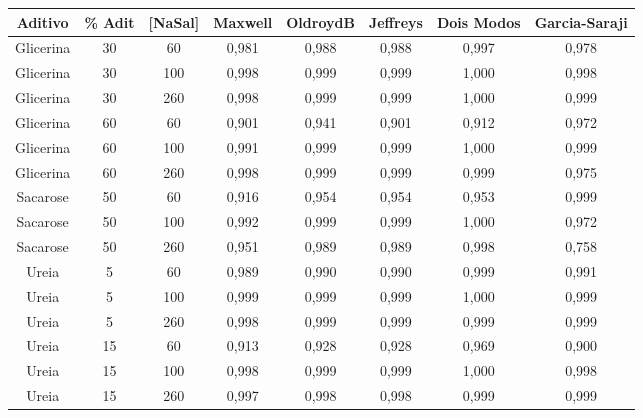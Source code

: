 	\begin{table}[h]
	{%
		\begin{tabular}{c c c | c c c c c}
			\toprule
            Aditivo  & \% Adit & [NaSal] & Maxwell & OldroydB & Jeffreys & Dois Modos  & Garcia-Saraji  \\ \midrule
			Glicerina & 30        & 60         & 0,981   & 0,988    & 0,988    & 0,997 & 0,978    \\
			Glicerina & 30        & 100        & 0,998   & 0,999    & 0,999    & 1,000 & 0,998    \\
			Glicerina & 30        & 260        & 0,998   & 0,999    & 0,999    & 1,000 & 0,999    \\
			Glicerina & 60        & 60         & 0,901   & 0,941    & 0,901    & 0,912 & 0,972    \\
			Glicerina & 60        & 100        & 0,991   & 0,999    & 0,999    & 1,000 & 0,999    \\
			Glicerina & 60        & 260        & 0,998   & 0,999    & 0,999    & 0,999 & 0,975    \\
			Sacarose  & 50        & 60         & 0,916   & 0,954    & 0,954    & 0,953 & 0,999    \\
			Sacarose  & 50        & 100        & 0,992   & 0,999    & 0,999    & 1,000 & 0,972    \\
			Sacarose  & 50        & 260        & 0,951   & 0,989    & 0,989    & 0,998 & 0,758    \\ \midrule
			Ureia   & 5         & 60         & 0,989   & 0,990    & 0,990    & 0,999   & 0,991  \\
			Ureia   & 5         & 100        & 0,999   & 0,999    & 0,999    & 1,000   & 0,999  \\
			Ureia   & 5         & 260        & 0,998   & 0,999    & 0,999    & 0,999   & 0,999  \\
			Ureia   & 15        & 60         & 0,913   & 0,928    & 0,928    & 0,969   & 0,900  \\
			Ureia   & 15        & 100        & 0,998   & 0,999    & 0,999    & 1,000   & 0,998  \\
			Ureia   & 15        & 260        & 0,997   & 0,998    & 0,998    & 0,999   & 0,999  \\

\end{tabular}}
\end{table}
